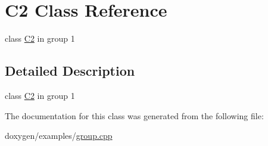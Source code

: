 \hypertarget{class_c2}{}\section{C2 Class Reference}
\label{class_c2}


class \mbox{\hyperlink{class_c2}{C2}} in group 1  




\subsection{Detailed Description}
class \mbox{\hyperlink{class_c2}{C2}} in group 1 

The documentation for this class was generated from the following file\+:\begin{DoxyCompactItemize}
\item 
doxygen/examples/\mbox{\hyperlink{group_8cpp}{group.\+cpp}}\end{DoxyCompactItemize}

